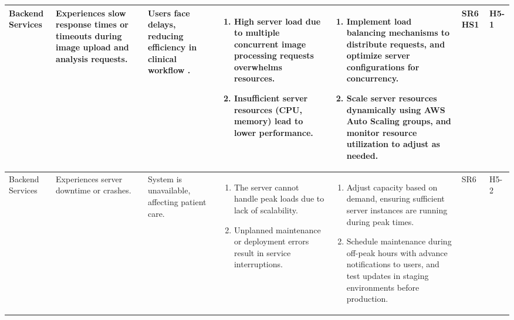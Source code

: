 \documentclass{article}
\begin{document}
\begin{landscape}
\begin{table}[ht]
{\begin{tabular}{|p{2.5cm}|p{2.5cm}|p{3cm}|p{5cm}|p{6cm}|p{1cm}|p{1cm}|}
     Backend Services
     & Experiences slow response times or timeouts during image upload and analysis requests.
     & Users face delays, reducing efficiency in clinical workflow .
     &
     \begin{enumerate}[leftmargin=*, label={\alph*.}, itemsep=1pt]
         \item High server load due to multiple concurrent image processing requests overwhelms resources.
         \item Insufficient server resources (CPU, memory) lead to lower performance.
     \end{enumerate}
     &
     \begin{enumerate}[leftmargin=*, label={\alph*.}, itemsep=1pt]
         \item Implement load balancing mechanisms to distribute requests, and optimize server configurations for concurrency.
         \item Scale server resources dynamically using AWS Auto Scaling groups, and monitor resource utilization to adjust as needed.
     \end{enumerate}
     & SR6 \newline HS1 & H5-1 \\ \hline

    Backend Services
     & Experiences server downtime or crashes.
     & System is unavailable, affecting patient care.
     &
     \begin{enumerate}[leftmargin=*, label={\alph*.}, itemsep=1pt]
         \item The server cannot handle peak loads due to lack of scalability.
         \item Unplanned maintenance or deployment errors result in service interruptions.
     \end{enumerate}
     &
     \begin{enumerate}[leftmargin=*, label={\alph*.}, itemsep=1pt]
         \item Adjust capacity based on demand, ensuring sufficient server instances are running during peak times.
         \item Schedule maintenance during off-peak hours with advance notifications to users, and test updates in staging environments before production.
     \end{enumerate}
     & SR6 & H5-2 \\ \hline

    \end{tabular}
    }
    \end{table}
\end{landscape}
\end{document}

